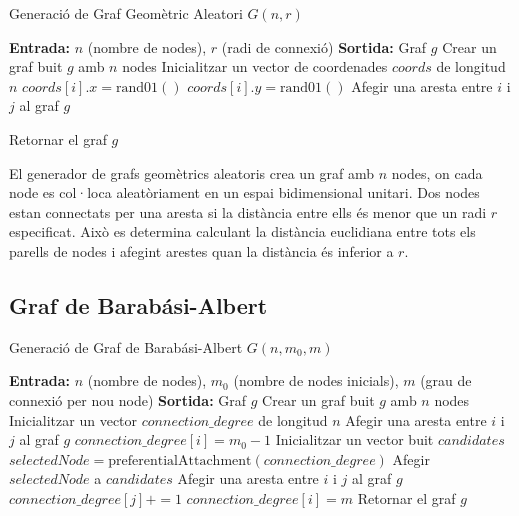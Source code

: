\documentclass[a4paper]{article}
\begin{document}
	\begin{algorithm} [H]
		\caption{Generació de Graf Geomètric Aleatori $G(n, r)$}
		\begin{algorithmic} [1]
			\Statex \textbf{Entrada:} $n$ (nombre de nodes), $r$ (radi de connexió)
			\Statex \textbf{Sortida:} Graf $g$
			\Statex \vspace{-0.25em}
			\State Crear un graf buit $g$ amb $n$ nodes
			\State Inicialitzar un vector de coordenades $coords$ de longitud $n$
				\State $coords[i].x = \text{rand01}()$
				\State $coords[i].y = \text{rand01}()$
			\EndFor
						\State Afegir una aresta entre $i$ i $j$ al graf $g$
					\EndIf

				\EndFor
			\EndFor
			\State Retornar el graf $g$
		\end{algorithmic}
	\end{algorithm}
	El generador de grafs geomètrics aleatoris crea un graf amb $n$ nodes, on cada node es col·loca aleatòriament en un espai bidimensional unitari. Dos nodes estan connectats per una aresta si la distància entre ells és menor que un radi $r$ especificat. Això es determina calculant la distància euclidiana entre tots els parells de nodes i afegint arestes quan la distància és inferior a $r$.
		
	\subsection{Graf de Barabási-Albert}

	\begin{algorithm} [H]
		\caption{Generació de Graf de Barabási-Albert $G(n, m_0, m)$}
		\begin{algorithmic} [1]
			\Statex \textbf{Entrada:} $n$ (nombre de nodes), $m_0$ (nombre de nodes inicials), $m$ (grau de connexió per nou node)
			\Statex \textbf{Sortida:} Graf $g$
			\Statex \vspace{-0.25em}
			\State Crear un graf buit $g$ amb $n$ nodes
			\State Inicialitzar un vector $connection\_degree$ de longitud $n$
					\State Afegir una aresta entre $i$ i $j$ al graf $g$
				\EndFor
				\State $connection\_degree[i] = m_0 - 1$
			\EndFor
				\State Inicialitzar un vector buit $candidates$
					\State $selectedNode = \text{preferentialAttachment}(connection\_degree)$
						\State Afegir $selectedNode$ a $candidates$
					\EndIf
				\EndWhile
					\State Afegir una aresta entre $i$ i $j$ al graf $g$
					\State $connection\_degree[j] += 1$
				\EndFor
				\State $connection\_degree[i] = m$
			\EndFor
			\State Retornar el graf $g$
		\end{algorithmic}
	\end{algorithm}
	
\end{document}
